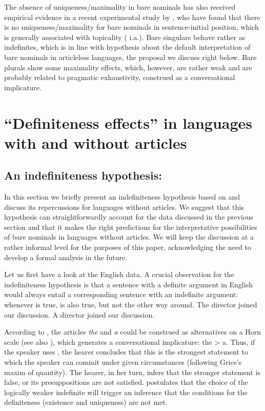 \documentclass[output=paper,
colorlinks,
citecolor=brown,
newtxmath
]{langscibook}
\begin{document}
\noindent The absence of uniqueness/maximality in  bare nominals has also received empirical evidence in a recent experimental study by \citet{Simik.Demian2020}, who have found that there is no uniqueness/maximality for bare nominals in sentence-initial position, which is generally associated with topicality (\citealt{Geist2010} i.a.). Bare singulars behave rather as indefinites, which is in line with  hypothesis about the default interpretation of bare nominals in articleless languages, the proposal we discuss right below. Bare plurals show some maximality effects, which, however, are rather weak and are probably related to pragmatic exhaustivity, construed as a conversational implicature.

\section{``Definiteness effects'' in languages with and without articles}
\label{sec:definiteness-effects}
\subsection{An indefiniteness hypothesis: \citet{Heim2011}}
In this section we briefly present an indefiniteness hypothesis based on \citet{Heim2011} and discuss its repercussions for languages without articles. We suggest that this hypothesis can straightforwardly account for the data discussed in the previous section and that it makes the right predictions for the interpretative possibilities of bare nominals in languages without articles. We will keep the discussion at a rather informal level for the purposes of this paper, acknowledging the need to develop a formal analysis in the future.

Let us
first have a look at the English data.
A crucial observation for the indefiniteness hypothesis is that a sentence with a definite argument in English would always entail a corresponding sentence with an indefinite argument: whenever  is true,  is also true, but not the other way around.
\ea
\ea \label{ex:seres:27a}
The director joined our discussion.
\ex \label{ex:seres:27b}
A director joined our discussion.
\z \z

\noindent According to \citet{Heim2011}, the articles \textit{the} and \textit{a} could be construed as alternatives on a Horn scale (see also \citealt{Hawkins1978}), %
which generates a conversational implicature: the > a. Thus, if the speaker uses , the hearer concludes that this is the strongest statement to which the speaker can commit under given circumstances (following Grice's maxim of quantity). The hearer, in her turn, infers that the stronger statement is false, or its presuppositions are not satisfied. \citet{Heim2011} postulates that the choice of the logically weaker indefinite will trigger an inference that the conditions for the definiteness (existence and uniqueness) are not met.
\end{document}

